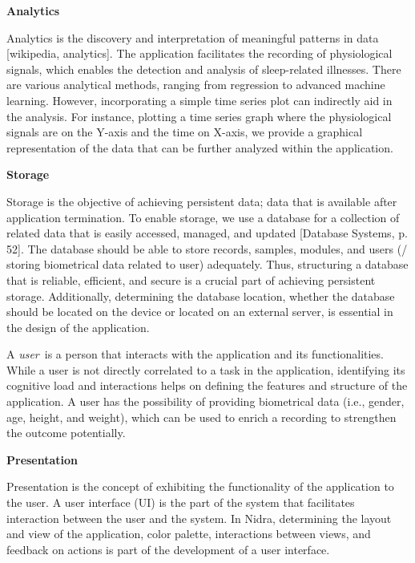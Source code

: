 \noindent \textbf{Analytics}

\noindent Analytics is the discovery and interpretation of meaningful patterns in data [wikipedia, analytics]. The application facilitates the recording of physiological signals, which enables the detection and analysis of sleep-related illnesses. There are various analytical methods, ranging from regression to advanced machine learning. However, incorporating a simple time series plot can indirectly aid in the analysis. For instance, plotting a time series graph where the physiological signals are on the Y-axis and the time on X-axis, we provide a graphical representation of the data that can be further analyzed within the application.

\noindent \textbf{Storage}

\noindent Storage is the objective of achieving persistent data; data that is available after application termination. To enable storage, we use a database for a collection of related data that is easily accessed, managed, and updated [Database Systems, p. 52]. The database should be able to store records, samples, modules, and users (/ storing biometrical data related to user) adequately. Thus, structuring a database that is reliable, efficient, and secure is a crucial part of achieving persistent storage. Additionally, determining the database location, whether the database should be located on the device or located on an external server, is essential in the design of the application.

\noindent A \textit{user} is a person that interacts with the application and its functionalities. While a user is not directly correlated to a task in the application, identifying its cognitive load and interactions helps on defining the features and structure of the application. A user has the possibility of providing biometrical data (i.e., gender, age, height, and weight), which can be used to enrich a recording to strengthen the outcome potentially.  

\noindent \textbf{Presentation}

\noindent Presentation is the concept of exhibiting the functionality of the application to the user. A user interface (UI) is the part of the system that facilitates interaction between the user and the system. In Nidra, determining the layout and view of the application, color palette, interactions between views, and feedback on actions is part of the development of a user interface. 